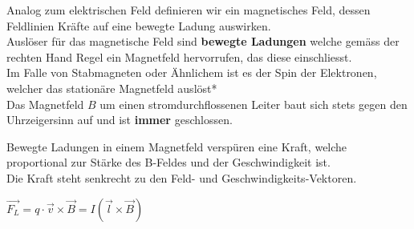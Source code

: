 	Analog zum elektrischen Feld definieren wir ein magnetisches Feld, dessen Feldlinien Kräfte auf eine bewegte Ladung auswirken. \\
	Auslöser für das magnetische Feld sind \textbf{bewegte Ladungen} welche gemäss der rechten Hand Regel ein Magnetfeld hervorrufen, das diese einschliesst. \\
	Im Falle von Stabmagneten oder 	Ähnlichem ist es der Spin der Elektronen, welcher das stationäre Magnetfeld auslöst*\\

	\beginip
	Das Magnetfeld $B$ um einen stromdurchflossenen Leiter baut sich stets gegen den Uhrzeigersinn auf und ist \textbf{immer} geschlossen. \\
	\begin{center}
	\end{center}
	\iend

	\beginip
	Bewegte Ladungen in einem Magnetfeld verspüren eine Kraft, welche proportional zur Stärke des B-Feldes und der Geschwindigkeit ist. \\
	Die Kraft steht senkrecht zu den Feld- und Geschwindigkeits-Vektoren.

	\formulaBegin
	$\vec{F_L} = q \cdot \vec{v} \times \vec{B} = I(\vec{l} \times \vec{B})$
	\formulaEnd


